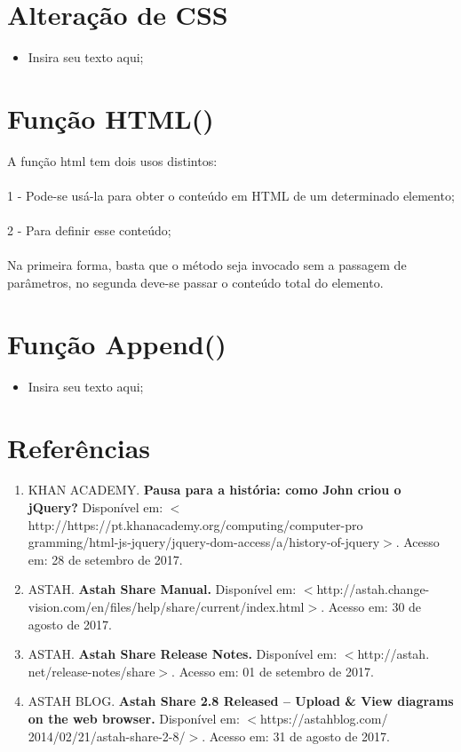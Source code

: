 \documentclass[12pt,a4paper]{article}
\begin{document}
\section{Alteração de CSS}%
\begin{itemize}

\item Insira seu texto aqui;
\end{itemize}

\section{Função HTML()}%

\item A função html tem dois usos distintos:
\\
\\
1 - Pode-se usá-la para obter o conteúdo em HTML de um determinado elemento;
\\
\\
2 - Para definir esse conteúdo;
\\
\\
Na primeira forma, basta que o método seja invocado sem a passagem de parâmetros, no segunda deve-se passar o conteúdo total do elemento.

\section{Função Append()}%
\begin{itemize}

\item Insira seu texto aqui;
\end{itemize}


\section{Referências}
\begin{enumerate}

\item KHAN ACADEMY. \textbf{Pausa para a história: como John criou o jQuery?} Disponível em: $<$http://https://pt.khanacademy.org/computing/computer-pro
gramming/html-js-jquery/jquery-dom-access/a/history-of-jquery$>$. Acesso em: 28 de setembro de 2017.

\item ASTAH. \textbf{Astah Share Manual.} Disponível em: $<$http://astah.change-vision.com/en/files/help/share/current/index.html$>$. Acesso em: 30 de agosto de 2017.

\item ASTAH. \textbf{Astah Share Release Notes.} Disponível em: $<$http://astah.
net/release-notes/share$>$. Acesso em: 01 de setembro de 2017.

\item ASTAH BLOG. \textbf{Astah Share 2.8 Released – Upload \& View diagrams on the web browser.}  Disponível em: $<$https://astahblog.com/
2014/02/21/astah-share-2-8/$>$. Acesso em: 31 de agosto de 2017.

\end{enumerate}
\end{document}
